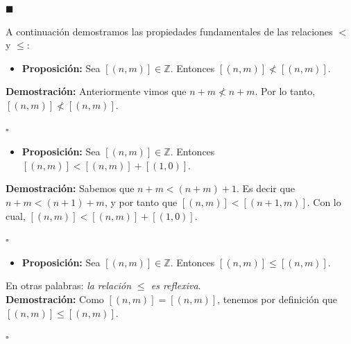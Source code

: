 \documentclass[10 pt]{article}
\begin{document}
\begin{flushright}
    $\blacksquare$
\end{flushright}

\Large{A continuación demostramos las propiedades fundamentales de las relaciones $<$ y $\leq$:} \\

\begin{itemize}
    \item \Large{\textbf{Proposición:} Sea $[(n,m)] \in \mathbb Z$. Entonces $[(n,m)] \nless [(n,m)]$.} \\
\end{itemize}

\Large{\textbf{Demostración:} Anteriormente vimos que $n+m \nless n+m$. Por lo tanto, $[(n,m)] \nless [(n,m)]$.} \\ 

\begin{flushright}
    $\square$
\end{flushright}

\begin{itemize}
    \item \Large{\textbf{Proposición:} Sea $[(n,m)] \in \mathbb Z$. Entonces $[(n,m)]<[(n,m)]+[(1,0)]$.} \\
\end{itemize}

\Large{\textbf{Demostración:} Sabemos que $n+m<(n+m)+1$. Es decir que $n+m<(n+1)+m$, y por tanto que $[(n,m)]<[(n+1,m)]$. Con lo cual, $[(n,m)]<[(n,m)]+[(1,0)]$.} \\

\begin{flushright}
    $\square$
\end{flushright}

\begin{itemize}
    \item \Large{\textbf{Proposición:} Sea $[(n,m)] \in \mathbb Z$. Entonces $[(n,m)] \leq [(n,m)]$.} \\
\end{itemize}

\Large{En otras palabras: \textit{la relación $\leq$ es reflexiva}.} \\

\Large{\textbf{Demostración:} Como $[(n,m)]=[(n,m)]$, tenemos por definición que $[(n,m)]\leq [(n,m)]$.} \\

\begin{flushright}
    $\square$
\end{flushright}
\end{document}
